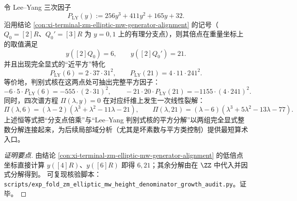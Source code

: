 \begin{conclusion}[分支点倍乘的 Lee--Yang 近平方特化：\texorpdfstring{$y=6,21$}{y=6,21} 的平方因子与四次谱方程线性裂解]\label{con:xi-terminal-zm-branchpoint-doubling-leyang-nearsquare-specializations}
令 Lee--Yang 三次因子
\[
P_{\mathrm{LY}}(y):=256y^{3}+411y^{2}+165y+32.
\]
沿用结论 \ref{con:xi-terminal-zm-elliptic-mw-generator-alignment} 的记号（\(Q_0=[2]R\)、\(Q_0'=[3]R\) 为 \(y=0,1\) 上的有理分支点），则其倍点在重量坐标上的取值满足
\[
y([2]Q_0)=6,\qquad y([2]Q_0')=21.
\]
并且出现完全显式的“近平方”特化
\[
P_{\mathrm{LY}}(6)=2\cdot 37\cdot 31^{2},\qquad P_{\mathrm{LY}}(21)=4\cdot 11\cdot 241^{2}.
\]
等价地，判别式核在这两点处可抽出完整平方因子：
\[
-6\cdot 5\cdot P_{\mathrm{LY}}(6)= -555\cdot(2\cdot 31)^{2},\qquad
-21\cdot 20\cdot P_{\mathrm{LY}}(21)= -1155\cdot(4\cdot 241)^{2}.
\]
同时，四次谱方程 \(\Pi(\lambda,y)=0\) 在对应纤维上发生一次线性裂解：
\[
\Pi(\lambda,6)=(\lambda-2)(\lambda^{3}+\lambda^{2}-11\lambda-21),\qquad
\Pi(\lambda,21)=(\lambda-6)(\lambda^{3}+5\lambda^{2}-13\lambda-77).
\]
上述恒等式把“分支点倍乘”与“Lee--Yang 判别式核的平方分解”以两组完全显式整数分解连接起来，为后续局部域分析（尤其是坏素数与平方类控制）提供最短算术入口。
\end{conclusion}
\begin{proof}[证明要点]
由结论 \ref{con:xi-terminal-zm-elliptic-mw-generator-alignment} 的低倍点坐标直接计算 \(y([4]R)\)、\(y([6]R)\) 即得 \(6,21\)；其余分解由在 \(\ZZ\) 中代入并因式分解得到。
可复现核验脚本：\texttt{scripts/exp\_fold\_zm\_elliptic\_mw\_height\_denominator\_growth\_audit.py}。证毕。
\end{proof}

